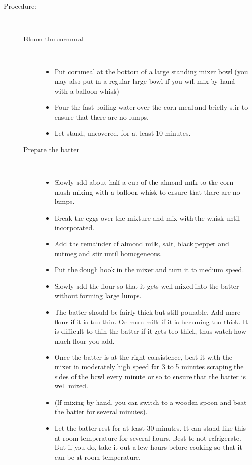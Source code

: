 \documentclass [11pt, letterpaper] {article}
\begin{document}
\begin{description}
\item[Procedure:]\ \\
	\begin{description}
	\item[Bloom the cornmeal]\ \\
		\begin{itemize}
			\item	Put cornmeal at the bottom of a large standing mixer bowl (you may also put in a regular large bowl if you will  mix by hand with a balloon whisk)   
			\item Pour the fast boiling water over the corn meal and briefly stir to ensure that there are no lumps.
			\item Let stand, uncovered, for at least 10 minutes.
		\end{itemize}
	\item[Prepare the batter]\ \\
		\begin{itemize}
			\item Slowly add about half a cup of the almond milk to the corn mush mixing with a balloon whisk to ensure that there are no lumps.
			\item Break the eggs over the mixture and mix with the whisk until incorporated.
			\item Add the remainder of almond milk, salt, black pepper and nutmeg and stir until homogeneous.
			\item Put the dough hook in the mixer and turn it to medium speed. 
			\item Slowly add the flour so that it gets well mixed into the batter without forming large lumps.
			\item The batter should be fairly thick but still pourable. Add more flour if it is too thin. Or more milk if it is becoming too thick. It is difficult to thin the batter if it gets too thick, thus watch how much flour you add.
			\item Once the batter is at the right consistence, beat it with the mixer in moderately high speed for 3 to 5 minutes scraping the sides of the bowl every minute or so to ensure that the batter is well mixed.
			\item (If mixing by hand, you can switch to a wooden spoon and beat the batter for several minutes).
			\item Let the batter rest for at least 30 minutes. It can stand like this at room temperature for several hours. Best to not refrigerate. But if you do, take it out a few hours before cooking so that it can be at room temperature.

\end{itemize}
\end{description}
\end{description}
\end{document}
